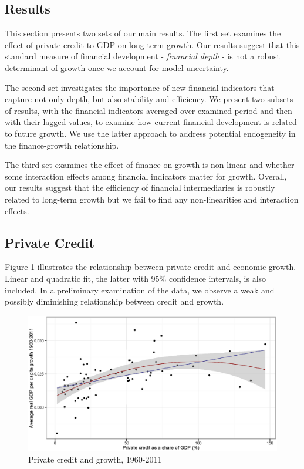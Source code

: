 \begin{refsection}
\section{Results}
\label{ch2sec:Results}
This section presents two sets of our main results. The first set examines the effect of private credit to GDP on long-term growth. Our results suggest that this standard measure of financial development - \textit{financial depth} - is not a robust determinant of growth once we account for model uncertainty.

The second set investigates the importance of new financial indicators that capture not only depth, but also stability and efficiency. We present two subsets of results, with the financial indicators averaged over examined period and then with their lagged values, to examine how current financial development is related to future growth. We use the latter approach to address potential endogeneity in the finance-growth relationship. 

The third set examines the effect of finance on growth is non-linear and whether some interaction effects among financial indicators matter for growth. Overall, our results suggest that the efficiency of financial intermediaries is robustly related to long-term growth but we fail to find any non-linearities and interaction effects.

%
%
\subsection{Private Credit}
\label{ch2subsec:PC}
%
Figure \ref{ch2fig:OLSPCGDP} illustrates the relationship between private credit and economic growth. Linear and quadratic fit, the latter with 95\% confidence intervals, is also included. In a preliminary examination of the data, we observe a weak and possibly diminishing relationship between credit and growth.
%
\begin{figure}[!ht]
	\centering
		\caption{Private credit and growth, 1960-2011}
		\label{ch2fig:OLSPCGDP}
		\includegraphics[width=\linewidth]{Figures/ch2/PConGDP1960-2011.eps}
\end{figure}


\end{refsection}
